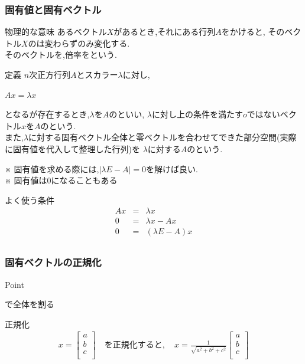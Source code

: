\documentclass[a4paper]{jsarticle}
\begin{document}
\subsubsection{固有値と固有ベクトル}
\begin{itembox}[l]{物理的な意味}
    あるベクトル$X$があるとき,それにある行列$A$をかけると,
    そのベクトル$X$のは変わらずのみ変化する.\\
    そのベクトルを,倍率をという.
\end{itembox}
\begin{itembox}[l]{定義}
    $n$次正方行列$A$とスカラー$\lambda$に対し,
    \begin{center}
        $Ax=\lambda x$
    \end{center}
    となるが存在するとき,$\lambda$を$A$のといい,
    $\lambda$に対し上の条件を満たす$o$ではないベクトル$x$を$A$のという.\\
    また,$\lambda$に対する固有ベクトル全体と零ベクトルを合わせてできた部分空間(実際に固有値を代入して整理した行列)を
    $\lambda$に対する$A$のという.
\end{itembox}
※ 固有値を求める際には,$|\lambda E-A|=0$を解けば良い.\\
※ 固有値は$0$になることもある\\
\begin{itembox}[l]{よく使う条件}
    \begin{eqnarray*}
        Ax&=&\lambda x\\
        0&=&\lambda x-Ax\\
        0&=&\left(\lambda E -A\right)x\\
    \end{eqnarray*}
\end{itembox}
\subsubsection{固有ベクトルの正規化}
\begin{itembox}[l]{Point}
    \begin{center}
        で全体を割る
    \end{center}
\end{itembox}
\begin{itembox}[l]{正規化}
    \begin{eqnarray*}
        x=
        \begin{bmatrix}
            a \\
            b \\
            c \\
        \end{bmatrix}
        \quad を正規化すると,\quad
        x=
        \frac{1}{\sqrt{a^2+b^2+c^2}}
        \begin{bmatrix}
            a \\
            b \\
            c \\
        \end{bmatrix}\\
    \end{eqnarray*}
\end{itembox}
\end{document}
